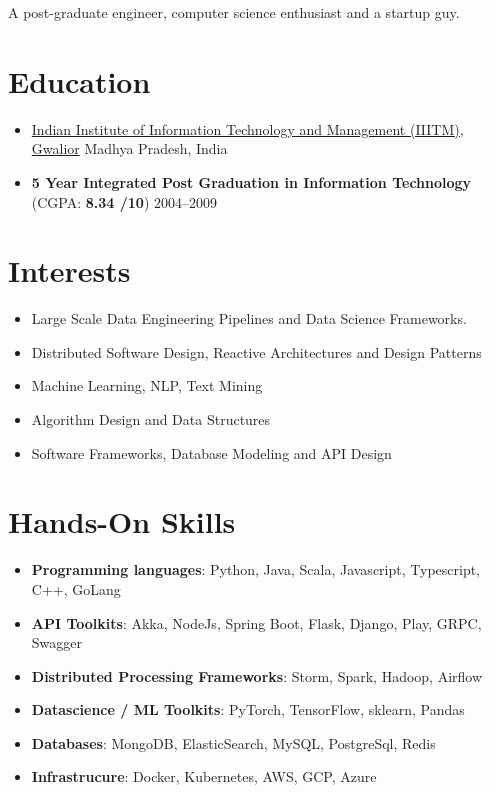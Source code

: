 \documentclass{article}
\begin{document}
A post-graduate engineer, computer science enthusiast and a startup guy.  

\fi

\section{Education}
\begin{itemize}[leftmargin=-0.1ex]\setlength\itemsep{0.25em}\vspace{-10pt}
  \item[]  \href{http://iiitm.ac.in}{Indian Institute of Information Technology and Management (IIITM), Gwalior} \hfill Madhya Pradesh, India
  \item[] \textbf{5 Year Integrated Post Graduation in Information Technology} (CGPA: \textbf{8.34 /10}) \hfill 2004--2009
\end{itemize}\vspace{-3pt}

\section{Interests}
\begin{itemize}[leftmargin=-0.1ex]\setlength\itemsep{0.25em}\vspace{-10pt}
  \item Large Scale Data Engineering Pipelines and Data Science Frameworks. 
  \item Distributed Software Design, Reactive Architectures and Design Patterns
  \item Machine Learning, NLP, Text Mining
  \item Algorithm Design and Data Structures
  \item Software Frameworks, Database Modeling and API Design
\end{itemize}\vspace{-3pt}

\section{Hands-On Skills }
\begin{itemize}[leftmargin=-0.1ex]\setlength\itemsep{0.25em}\vspace{-10pt}
  \item \textbf{Programming languages}: Python, Java, Scala, Javascript, Typescript, C++, GoLang
  \item \textbf{API Toolkits}: Akka, NodeJs, Spring Boot, Flask, Django, Play, GRPC, Swagger
  \item \textbf{Distributed Processing Frameworks}: Storm, Spark, Hadoop, Airflow
  \item \textbf{Datascience / ML Toolkits}: PyTorch, TensorFlow, sklearn, Pandas
  \item \textbf{Databases}: MongoDB, ElasticSearch, MySQL, PostgreSql, Redis
  \item \textbf{Infrastrucure}: Docker, Kubernetes, AWS, GCP, Azure
\end{itemize}\vspace{-3pt}
  
\end{document}
